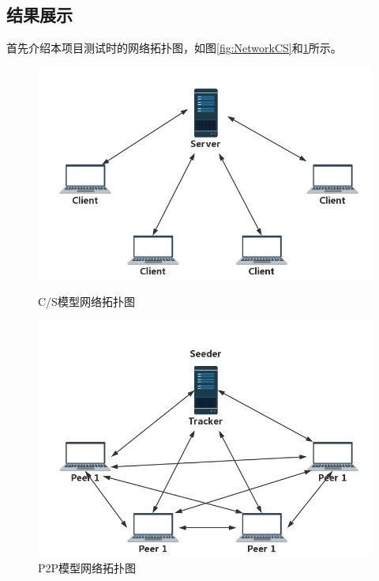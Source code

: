 \documentclass[15pt]{ctexart}
\begin{document}
\subsection{结果展示} %
\label{sub:结果展示}
首先介绍本项目测试时的网络拓扑图，如图\ref{fig:NetworkCS}和\ref{fig:NetworkP2P}所示。
\begin{figure}[H]
\begin{minipage}{0.48\linewidth}
	\centering
	\includegraphics[width=0.9\linewidth]{imgs/NetworkCS.png}
	\caption{C/S模型网络拓扑图}
	\label{fig:NetworkCS}
	\end{minipage}
	\centering
	\begin{minipage}{0.48\linewidth}
	\includegraphics[width=0.9\linewidth]{imgs/NetworkP2P.png}
	\caption{P2P模型网络拓扑图}
	\label{fig:NetworkP2P}
	\end{minipage}
\end{figure}
\\
\\
\\
\\
\end{document}
